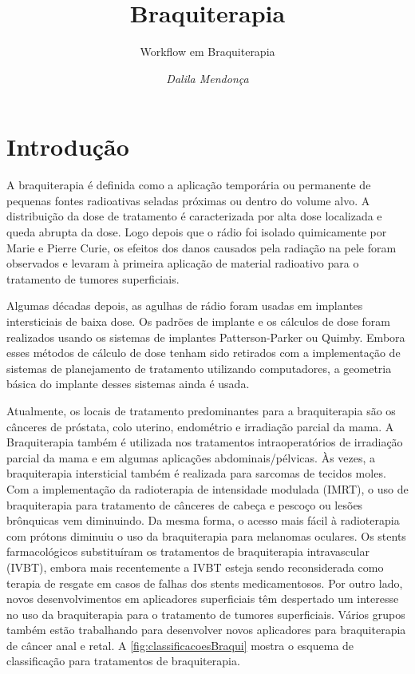 \documentclass[11pt,a4paper]{article}
\title{\LobsterTwo\Huge{Braquiterapia}}
\author{\LobsterTwo\Large{Workflow em Braquiterapia}\nocite{*}}
\date{\LobsterTwo\textit{Dalila Mendonça}}
\begin{document}
	\maketitle

\section{Introdução}

	A braquiterapia é definida como a aplicação temporária ou permanente de pequenas fontes radioativas seladas próximas ou dentro do volume alvo. A distribuição da dose de tratamento é caracterizada por alta dose localizada e queda abrupta da dose. Logo depois que o rádio foi isolado quimicamente por Marie e Pierre Curie, os efeitos dos danos causados pela radiação na pele foram observados e levaram à primeira aplicação de material radioativo para o tratamento de tumores superficiais. 

	Algumas décadas depois, as agulhas de rádio foram usadas em implantes intersticiais de baixa dose. Os padrões de implante e os cálculos de dose foram realizados usando os sistemas de implantes Patterson-Parker ou Quimby. Embora esses métodos de cálculo de dose tenham sido retirados com a implementação de sistemas de planejamento de tratamento utilizando computadores, a geometria básica do implante desses sistemas ainda é usada.

	Atualmente, os locais de tratamento predominantes para a braquiterapia são os cânceres de próstata, colo uterino, endométrio e irradiação parcial da mama. A Braquiterapia também é utilizada nos tratamentos intraoperatórios de irradiação parcial da mama e em algumas aplicações abdominais/pélvicas. Às vezes, a braquiterapia intersticial também é realizada para sarcomas de tecidos moles. Com a implementação da radioterapia de intensidade modulada (IMRT), o uso de braquiterapia para tratamento de cânceres de cabeça e pescoço ou lesões brônquicas vem diminuindo. Da mesma forma, o acesso mais fácil à radioterapia com prótons diminuiu o uso da braquiterapia para melanomas oculares. Os stents farmacológicos substituíram os tratamentos de braquiterapia intravascular (IVBT), embora mais recentemente a IVBT esteja sendo reconsiderada como terapia de resgate em casos de falhas dos stents medicamentosos. Por outro lado, novos desenvolvimentos em aplicadores superficiais têm despertado um interesse no uso da braquiterapia para o tratamento de tumores superficiais. Vários grupos também estão trabalhando para desenvolver novos aplicadores para braquiterapia de câncer anal e retal. A \ref{fig:classificacoesBraqui} mostra o esquema de classificação para tratamentos de braquiterapia.
\end{document}
